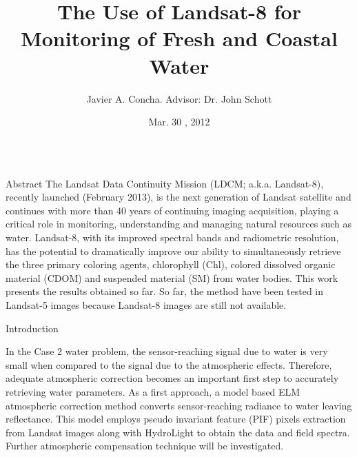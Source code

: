 \documentclass[mathserif]{beamer}
\title{ \huge The Use of Landsat-8 for Monitoring of Fresh and Coastal Water}
\author[]{Javier A. Concha. Advisor: Dr. John Schott}
\institute[Rochester Institute of Technology]{Digital Imaging and Remote Sensing Laboratory \\ Chester F. Carlson Center for Imaging Science\\ Rochester Institute of Technology \\ Rochester, New York, USA}
\date[Mar. 30 , 2012]{Mar. 30 , 2012}
\begin{document}
\begin{frame}{} 
  \begin{columns}[t]
    

\begin{column}{.3\linewidth}
\begin{block}{Abstract}
\justifying\small The Landsat Data Continuity Mission (LDCM; a.k.a. Landsat-8), recently launched (February 2013), is the next generation of Landsat satellite and continues with more than 40 years of continuing imaging acquisition, playing a critical role in monitoring, understanding and managing natural resources such as water. Landsat-8, with its improved spectral bands and radiometric resolution, has the potential to dramatically improve our ability to simultaneously retrieve the three primary coloring agents, chlorophyll (Chl), colored dissolved organic material (CDOM) and suspended material (SM) from water bodies. This work presents the results obtained so far. So far, the method have been tested in Landsat-5 images because Landsat-8 images are still not available.


\vspace{1cm}
\end{block}

      
\begin{block}{Introduction}
   		

\justifying\small In the Case 2 water problem, the sensor-reaching signal due to water is very small when compared to the signal due to the atmospheric effects. Therefore, adequate atmospheric correction becomes an important first step to accurately retrieving water parameters. As a first approach, a model based ELM atmospheric correction method converts sensor-reaching radiance to water leaving reflectance. This model employs pseudo invariant feature (PIF) pixels extraction from Landsat images along with HydroLight to obtain the data and field spectra. Further atmospheric compensation technique will be investigated.


\end{block}
\end{column}
\end{columns}
\end{frame}
\end{document}
